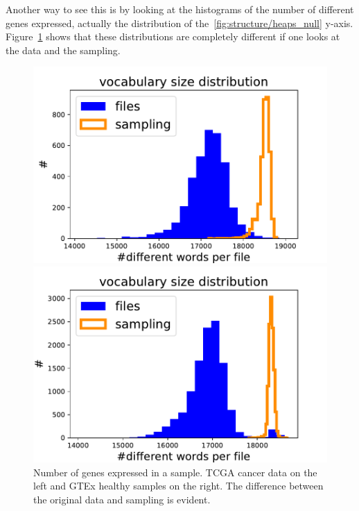 Another way to see this is by looking at the histograms of the number of different genes expressed, actually the distribution of the~\ref{fig:structure/heaps_null} y-axis. Figure~\ref{fig:structure/diffwordsDistr_null} shows that these distributions are completely different if one looks at the data and the sampling.
\begin{figure}[htb!]
\begin{minipage}{0.5\textwidth}
    \centering
    \includegraphics[width=0.95\linewidth]{pictures/structure/tcga/diffwordsDistr_null.pdf}
    \end{minipage}
\hspace{2mm}
\begin{minipage}{0.5\textwidth}
    \centering
    \includegraphics[width=0.95\linewidth]{pictures/structure/gtex/diffwordsDistr_null.pdf}
    \end{minipage}
\caption{Number of genes expressed in a sample. TCGA cancer data on the left and GTEx healthy samples on the right. The difference between the original data and sampling is evident.}
\label{fig:structure/diffwordsDistr_null}
\end{figure}
